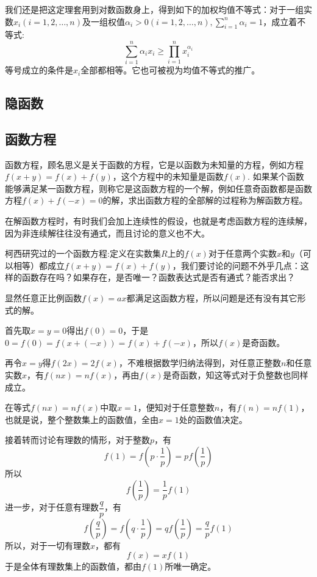 我们还是把这定理套用到对数函数身上，得到如下的加权均值不等式：对于一组实数$x_i(i=1,2,\ldots,n)$及一组权值$\alpha_i>0(i=1,2,\ldots,n),\sum_{i=1}^n\alpha_i=1$，成立着不等式:
\begin{equation}
  \label{eq:poly-neq-for-mean-with-weight}
 \sum_{i=1}^n\alpha_i x_i \geqslant \prod_{i=1}^nx_i^{\alpha_i} 
\end{equation}
等号成立的条件是$x_i$全部都相等。它也可被视为均值不等式的推广。

\subsection{隐函数}
\label{sec:hided-function}


\subsection{函数方程}
\label{sec:function-equation}


函数方程，顾名思义是关于函数的方程，它是以函数为未知量的方程，例如方程$f(x+y)=f(x)+f(y)$，这个方程中的未知量是函数$f(x)$. 如果某个函数能够满足某一函数方程，则称它是这函数方程的一个解，例如任意奇函数都是函数方程$f(x)+f(-x)=0$的解，求出函数方程的全部解的过程称为解函数方程。

在解函数方程时，有时我们会加上连续性的假设，也就是考虑函数方程的连续解，因为非连续解往往没有通式，而且讨论的意义也不大。

柯西研究过的一个函数方程:定义在实数集$R$上的$f(x)$对于任意两个实数$x$和$y$（可以相等）都成立$f(x+y)=f(x)+f(y)$，我们要讨论的问题不外乎几点：这样的函数存在吗？如果存在，是否唯一？函数表达式是否有通式？能否求出？

显然任意正比例函数$f(x)=ax$都满足这函数方程，所以问题是还有没有其它形式的解。

首先取$x=y=0$得出$f(0)=0$，于是$0=f(0)=f(x+(-x))=f(x)+f(-x)$，所以$f(x)$是奇函数。

再令$x=y$得$f(2x)=2f(x)$，不难根据数学归纳法得到，对任意正整数$n$和任意实数$x$，有$f(nx)=nf(x)$，再由$f(x)$是奇函数，知这等式对于负整数也同样成立。

在等式$f(nx)=nf(x)$中取$x=1$，便知对于任意整数$n$，有$f(n)=nf(1)$，也就是说，整个整数集上的函数值，全由$x=1$处的函数值决定。

接着转而讨论有理数的情形，对于整数$p$，有
\[ f(1)=f \left( p\cdot \frac{1}{p} \right) = p f \left( \frac{1}{p} \right) \]
所以
\[ f \left( \frac{1}{p} \right) = \frac{1}{p} f(1) \]
进一步，对于任意有理数$\dfrac{q}{p}$，有
\[ f \left( \frac{q}{p} \right) = f \left( q \cdot \frac{1}{p} \right) = q f \left( \frac{1}{p} \right) = \frac{q}{p} f(1) \]
所以，对于一切有理数$x$，都有
\[ f(x) = x f(1) \]
于是全体有理数集上的函数值，都由$f(1)$所唯一确定。

